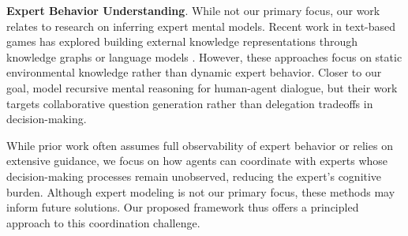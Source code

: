 \textbf{Expert Behavior Understanding}.
While not our primary focus, our work relates to research on inferring expert mental models. Recent work in text-based games has explored building external knowledge representations through knowledge graphs \citep{adhikari2020learning, ammanabrolu2020graph} or language models \citep{safavi2021relational}. However, these approaches focus on static environmental knowledge rather than dynamic expert behavior. 
Closer to our goal, \citet{roman-roman-etal-2020-rmm} model recursive mental reasoning for human-agent dialogue, but their work targets collaborative question generation rather than delegation tradeoffs in decision-making.


While prior work often assumes full observability of expert behavior or relies on extensive guidance, we focus on how agents can coordinate with experts whose decision-making processes remain unobserved, reducing the expert's cognitive burden. Although expert modeling is not our primary focus, these methods may inform future \ourMethod solutions. Our proposed \ourMethod framework thus offers a principled approach to this coordination challenge.

